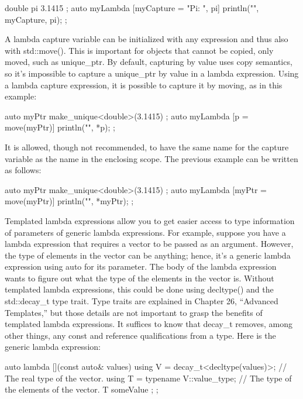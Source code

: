 \begin{cpp}
double pi { 3.1415 };
auto myLambda { [myCapture = "Pi: ", pi]{ println("{}{}", myCapture, pi); } };
\end{cpp}

A lambda capture variable can be initialized with any expression and thus also with std::move(). This is important for objects that cannot be copied, only moved, such as unique\_ptr. By default, capturing by value uses copy semantics, so it’s impossible to capture a unique\_ptr by value in a lambda expression. Using a lambda capture expression, it is possible to capture it by moving, as in this example:

\begin{cpp}
auto myPtr { make_unique<double>(3.1415) };
auto myLambda { [p = move(myPtr)]{ println("{}", *p); } };
\end{cpp}

It is allowed, though not recommended, to have the same name for the capture variable as the name in the enclosing scope. The previous example can be written as follows:

\begin{cpp}
auto myPtr { make_unique<double>(3.1415) };
auto myLambda { [myPtr = move(myPtr)]{ println("{}", *myPtr); } };
\end{cpp}



Templated lambda expressions allow you to get easier access to type information of parameters of generic lambda expressions. For example, suppose you have a lambda expression that requires a vector to be passed as an argument. However, the type of elements in the vector can be anything; hence, it’s a generic lambda expression using auto for its parameter. The body of the lambda expression wants to figure out what the type of the elements in the vector is. Without templated lambda expressions, this could be done using decltype() and the std::decay\_t type trait. Type traits are explained in Chapter 26, “Advanced Templates,” but those details are not important to grasp the benefits of templated lambda expressions. It suffices to know that decay\_t removes, among other things, any const and reference qualifications from a type. Here is the generic lambda expression:

\begin{cpp}
auto lambda { [](const auto& values) {
        using V = decay_t<decltype(values)>; // The real type of the vector.
        using T = typename V::value_type; // The type of the elements of the vector.
        T someValue { };
} };
\end{cpp}

